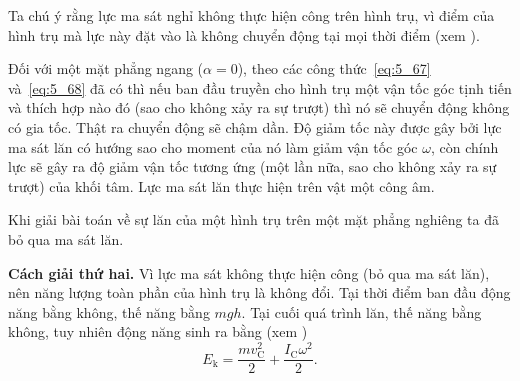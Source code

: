 Ta chú ý rằng lực ma sát nghỉ không thực hiện công trên hình trụ, vì điểm của hình trụ mà lực này đặt vào là không chuyển động tại mọi thời điểm (xem ).

Đối với một mặt phẳng ngang ($\alpha=0$), theo các công thức~\eqref{eq:5_67} và~\eqref{eq:5_68} đã có thì nếu ban đầu truyền cho hình trụ một vận tốc góc tịnh tiến và thích hợp nào đó (sao cho không xảy ra sự trượt) thì nó sẽ chuyển động không có gia tốc. Thật ra chuyển động sẽ chậm dần. Độ giảm tốc này được gây bởi lực ma sát lăn có hướng sao cho moment của nó làm giảm vận tốc góc $\omega$, còn chính lực sẽ gây ra độ giảm vận tốc tương ứng (một lần nữa, sao cho không xảy ra sự trượt) của khối tâm. Lực ma sát lăn thực hiện trên vật một công âm.

Khi giải bài toán về sự lăn của một hình trụ trên một mặt phẳng nghiêng ta đã bỏ qua ma sát lăn.

\textbf{Cách giải thứ hai.} Vì lực ma sát không thực hiện công (bỏ qua ma sát lăn), nên năng lượng toàn phần của hình trụ là không đổi. Tại thời điểm ban đầu động năng bằng không, thế năng bằng $mgh$. Tại cuối quá trình lăn, thế năng bằng không, tuy nhiên động năng sinh ra bằng (xem ) %
\begin{equation*}
	E_{\text{k}} = \frac{mv_{\text{C}}^2}{2} + \frac{I_{\text{C}}\omega^2}{2}.
\end{equation*}

